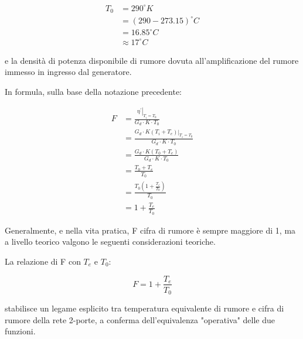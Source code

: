 {
    \Large 
    \begin{equation}
        \begin{split}
            T_0 
            &= 
            290 ^{\circ} K
            \\ 
            &= 
            (290 - 273.15) ^{\circ} C 
            \\
            &= 
            16.85 ^{\circ} C
            \\
            &\approx 
            17 ^{\circ} C
        \end{split}
    \end{equation}
}


e la densità di potenza disponibile di rumore dovuta all'amplificazione del rumore immesso in ingresso dal generatore. \newline

In formula, sulla base della notazione precedente: 

{
    \Large 
    \begin{equation}
        \begin{split}
            F 
            &= 
            \frac{\left. \eta^{'} \right|_{T_i = T_0}}{G_d \cdot K \cdot T_0 }
            \\
            &= 
            \frac{\left. G_d \cdot K (T_i + T_e) \right|_{T_i = T_0}}{G_d \cdot K \cdot T_0 }
            \\
            &=
            \frac{ G_d \cdot K (T_0 + T_e) }{G_d \cdot K \cdot T_0 }
            \\
            &=
            \frac{T_0 + T_e}{T_0}
            \\
            &= 
            \frac{T_0 (1 + \frac{T_e}{T_0})}{T_0}
            \\
            &= 
            1 + \frac{T_e}{T_0}
        \end{split}
    \end{equation}
}

Generalmente, e nella vita pratica, F cifra di rumore è sempre maggiore di 1, ma a livello teorico valgono le seguenti considerazioni teoriche. \newline 

La relazione di F con $T_e$ e $T_0$: 

{
    \Large 
    \begin{equation}
        F = 1 + \frac{T_e}{T_0}
    \end{equation}
}

stabilisce un legame esplicito tra temperatura equivalente di rumore e cifra di rumore della rete 2-porte, 
a conferma dell'equivalenza "operativa" delle due funzioni. \newline

